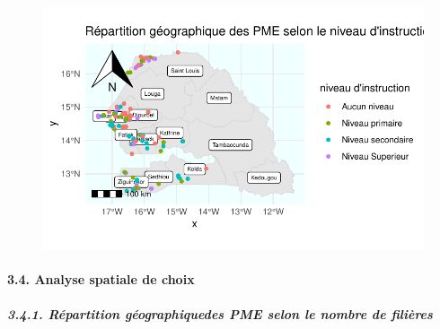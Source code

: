 \documentclass[
  letterpaper,
  DIV=11,
  numbers=noendperiod]{scrartcl}
\let\oldparagraph\paragraph
\renewcommand{\paragraph}[1]{\oldparagraph{#1}\mbox{}}
\let\oldsubparagraph\subparagraph
\renewcommand{\subparagraph}[1]{\oldsubparagraph{#1}\mbox{}}
\begin{document}
\begin{figure}[H]

{\centering \includegraphics{projet_R_files/figure-pdf/unnamed-chunk-40-1.pdf}

}

\end{figure}

\hypertarget{analyse-spatiale-de-choix}{%
\paragraph{\texorpdfstring{\textbf{3.4. Analyse spatiale de
choix}}{3.4. Analyse spatiale de choix}}\label{analyse-spatiale-de-choix}}

\hypertarget{ruxe9partition-guxe9ographiquedes-pme-selon-le-nombre-de-filiuxe8res}{%
\subparagraph{3.4.1. Répartition géographiquedes PME selon le nombre de
filières}\label{ruxe9partition-guxe9ographiquedes-pme-selon-le-nombre-de-filiuxe8res}}
\end{document}
